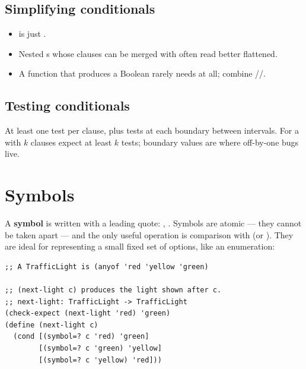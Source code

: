 \subsection{Simplifying conditionals}
\begin{itemize}
  \item {} is just .
  \item Nested s whose clauses can be merged with  often read better flattened.
  \item A function that produces a Boolean rarely needs  at all; combine //.
\end{itemize}

\subsection{Testing conditionals}
At least one test per clause, plus tests at each boundary between intervals.
For a  with $k$ clauses expect at least $k$ tests; boundary values
are where off-by-one bugs live.

\section{Symbols}
A \textbf{symbol} is written with a leading quote: ,
. Symbols are atomic --- they cannot be taken apart --- and the
only useful operation is comparison with  (or ).
They are ideal for representing a small fixed set of options, like an
enumeration:

\begin{lstlisting}[style=racket]
;; A TrafficLight is (anyof 'red 'yellow 'green)

;; (next-light c) produces the light shown after c.
;; next-light: TrafficLight -> TrafficLight
(check-expect (next-light 'red) 'green)
(define (next-light c)
  (cond [(symbol=? c 'red) 'green]
        [(symbol=? c 'green) 'yellow]
        [(symbol=? c 'yellow) 'red]))
\end{lstlisting}

